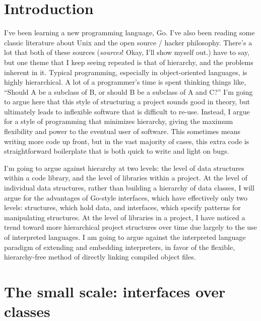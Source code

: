 \documentclass[12pt]{article}
\begin{document}
\maketitle


\section{Introduction}

I've been learning a new programming language, Go. I've also been reading some
classic literature about Unix and the open source / hacker philosophy. There's
a lot that both of these sources (\textit{sources}! Okay, I'll show myself
out.) have to say, but one theme that I keep seeing repeated is that of
hierarchy, and the problems inherent in it. Typical programming, especially in
object-oriented languages, is highly hierarchical. A lot of a programmer's time
is spent thinking things like, ``Should A be a subclass of B, or should B be a
subclass of A and C?'' I'm going to argue here that this style of structuring a
project sounds good in theory, but ultimately leads to inflexible software that
is difficult to re-use. Instead, I argue for a style of programming that
minimizes hierarchy, giving the maximum flexibility and power to the eventual
user of software. This sometimes means writing more code up front, but in the
vast majority of cases, this extra code is straightforward boilerplate that is
both quick to write and light on bugs.

I'm going to argue against hierarchy at two levels: the level of data
structures within a code library, and the level of libraries within a project.
At the level of individual data structures, rather than building a hierarchy of
data classes, I will argue for the advantages of Go-style interfaces, which
have effectively only two levels: structures, which hold data, and interfaces,
which specify patterns for manipulating structures.  At the level of libraries
in a project, I have noticed a trend toward more hierarchical project
structures over time due largely to the use of interpreted languages.  I am
going to argue against the interpreted language paradigm of extending and
embedding interpreters, in favor of the flexible, hierarchy-free method of
directly linking compiled object files.

\section{The small scale: interfaces over classes}
\end{document}
